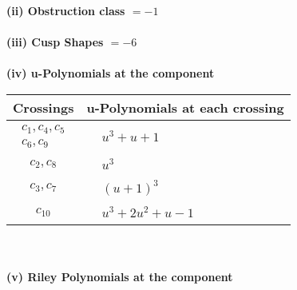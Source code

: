 \documentclass[1p]{elsarticle_modified}
\theoremstyle{definition}
\begin{document}
\flushleft \textbf{(ii) Obstruction class $= -1$}\\~\\
\flushleft \textbf{(iii) Cusp Shapes $= -6$}\\~\\
\newpage\renewcommand{\arraystretch}{1}
\flushleft \textbf{(iv) u-Polynomials at the component}\newline \\
\begin{tabular}{m{50pt}|m{274pt}}
Crossings & \hspace{64pt}u-Polynomials at each crossing \\
\hline $$\begin{aligned}c_{1},c_{4},c_{5}\\c_{6},c_{9}\end{aligned}$$&$\begin{aligned}
&u^3+u+1
\end{aligned}$\\
\hline $$\begin{aligned}c_{2},c_{8}\end{aligned}$$&$\begin{aligned}
&u^3
\end{aligned}$\\
\hline $$\begin{aligned}c_{3},c_{7}\end{aligned}$$&$\begin{aligned}
&(u+1)^3
\end{aligned}$\\
\hline $$\begin{aligned}c_{10}\end{aligned}$$&$\begin{aligned}
&u^3+2 u^2+u-1
\end{aligned}$\\
\hline
\end{tabular}\\~\\
\newpage\renewcommand{\arraystretch}{1}
\flushleft \textbf{(v) Riley Polynomials at the component}\newline \\
\end{document}
